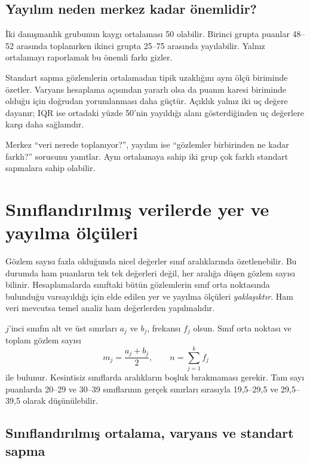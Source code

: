 \subsection{Yayılım neden merkez kadar önemlidir?}

İki danışmanlık grubunun kaygı ortalaması 50 olabilir. Birinci grupta puanlar
48--52 arasında toplanırken ikinci grupta 25--75 arasında yayılabilir. Yalnız
ortalamayı raporlamak bu önemli farkı gizler.

Standart sapma gözlemlerin ortalamadan tipik uzaklığını aynı ölçü biriminde
özetler. Varyans hesaplama açısından yararlı olsa da puanın karesi biriminde
olduğu için doğrudan yorumlanması daha güçtür. Açıklık yalnız iki uç değere
dayanır; IQR ise ortadaki yüzde 50'nin yayıldığı alanı gösterdiğinden uç
değerlere karşı daha sağlamdır.

\begin{sezgibox}
Merkez ``veri nerede toplanıyor?'', yayılım ise ``gözlemler birbirinden ne
kadar farklı?'' sorusunu yanıtlar. Aynı ortalamaya sahip iki grup çok farklı
standart sapmalara sahip olabilir.
\end{sezgibox}

\section{Sınıflandırılmış verilerde yer ve yayılma ölçüleri}

Gözlem sayısı fazla olduğunda nicel değerler sınıf aralıklarında özetlenebilir.
Bu durumda ham puanların tek tek değerleri değil, her aralığa düşen gözlem
sayısı bilinir. Hesaplamalarda sınıftaki bütün gözlemlerin sınıf orta
noktasında bulunduğu varsayıldığı için elde edilen yer ve yayılma ölçüleri
\emph{yaklaşıktır}. Ham veri mevcutsa temel analiz ham değerlerden yapılmalıdır.

$j$'inci sınıfın alt ve üst sınırları $a_j$ ve $b_j$, frekansı $f_j$ olsun.
Sınıf orta noktası ve toplam gözlem sayısı
\[
m_j=\frac{a_j+b_j}{2},
\qquad
n=\sum_{j=1}^{k}f_j
\]
ile bulunur. Kesintisiz sınıflarda aralıkların boşluk bırakmaması gerekir.
Tam sayı puanlarda 20--29 ve 30--39 sınıflarının gerçek sınırları sırasıyla
19,5--29,5 ve 29,5--39,5 olarak düşünülebilir.

\subsection{Sınıflandırılmış ortalama, varyans ve standart sapma}

